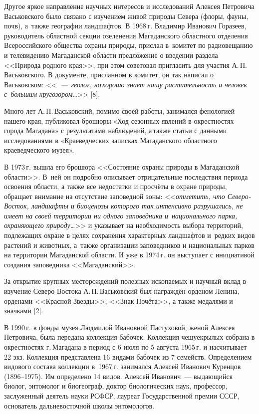 Другое яркое направление научных интересов и исследований Алексея Петровича Васьковского было связано с изучением живой природы Севера (флоры, фауны, почв), а~также географии ландшафтов. В 1968\,г. Владимир Иванович Горазеев, руководитель областной секции озеленения Магаданского областного отделения Всероссийского общества охраны природы, прислал в~комитет по радиовещанию и телевидению Магаданской области предложение о введении раздела <<Природа родного края>>, при этом советовал пригласить для участия А.\,П.\,Васьковского. В документе, присланном в комитет, он так написал о Васьковском: <<\textit{\mbox{~--- геолог,} но\,хорошо знает нашу растительность и человек с~большим кругозором\dots}>> [8].

Много лет А.\,П.\,Васьковский, помимо своей работы, занимался фенологией нашего края, публиковал брошюры «Ход сезонных явлений в окрестностях города Магадана» с результатами наблюдений, а\,также статьи с данными исследованиями в «Краеведческих записках Магаданского областного краеведческого музея».

В 1973\,г. вышла его брошюра <<Состояние охраны природы в Магаданской области>>. В~ней он подробно описывает отрицательные последствия периода освоения области, а также все недостатки и просчёты в охране природы, обращает внимание на отсутствие заповедной зоны: <<\textit{ отметить, что Северо-Восток, ландшафты и биоценозы которого так интенсивно разрушались, не имеет на своей территории ни одного заповедника и~национального парка, охраняющего природу\dots}>> и указывает на необходимость выбора территорий, подлежащих охране в целях сохранения характерных ландшафтов и~редких видов растений и животных, а~также организации заповедников и национальных парков на территории Магаданской области. И уже в 1974\,г. он выступает с инициативой создания заповедника <<Магаданский>>.

За открытие крупных месторождений полезных ископаемых и научный вклад в изучение Северо-Востока А.\,П.\,Васьковский был награждён орденом Ленина, орденами <<Красной Звезды>>, <<Знак Почёта>>, а также медалями и значками [2].

В 1990\,г. в фонды музея Людмилой Ивановной Пастуховой, женой Алексея Петровича, была передана коллекция бабочек. Коллекция чешуекрылых собрана в окрестностях г.\,Магадана в период с 6 июля по 5 августа 1965\,г. и насчитывает 22 экз. Коллекция представлена 16 видами бабочек из 7 семейств. Определением видового состава коллекции в~1967\,г. занимался Алексей Иванович Куренцов (1896--1975). Им определено 14 видов.
Алексей Иванович~--- выдающийся биолог, энтомолог и биогеограф, доктор биологических наук, профессор, заслуженный деятель науки РСФСР, лауреат Государственной премии СССР, основатель дальневосточной школы энтомологов.

